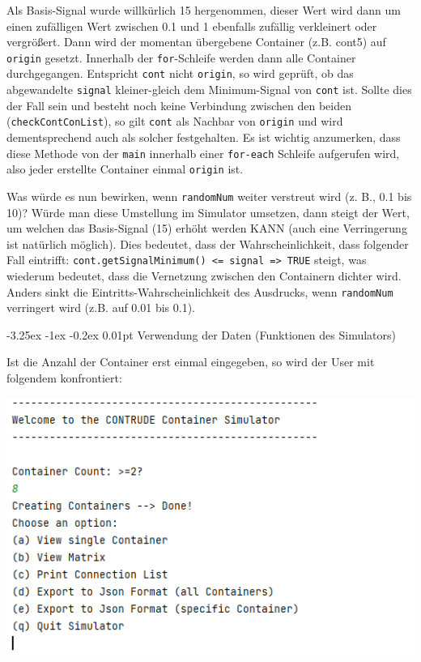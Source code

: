 \documentclass[
    headings=optiontotocandhead,%
    twoside,
    numbers=noenddot,%
    12pt, %
    titlepage, %
    parskip=full, %
    listof=leveldown, 
    numbers=noenddot, %
    a4paper,DIV=14,
    BCOR=15mm,
]{scrbook}
\makeatletter
\newcommand{\passthrough}[1]{#1}
\let\origfigure=\figure
\let\endorigfigure=\endfigure
\renewenvironment{figure}[1][]{%
   \origfigure[H]
}{%
   \endorigfigure
}
\renewcommand\paragraph{\@startsection{paragraph}{4}{\z@}%
    {-3.25ex \@plus -1ex \@minus -0.2ex}%
    {0.01pt}%
    {\raggedsection\normalfont\sectfont\nobreak\size@paragraph}%
  }
\makeatother
\begin{document}
Als Basis-Signal wurde willkürlich 15 hergenommen, dieser Wert wird dann
um einen zufälligen Wert zwischen 0.1 und 1 ebenfalls zufällig
verkleinert oder vergrößert. Dann wird der momentan übergebene Container
(z.B. cont5) auf \passthrough{\lstinline!origin!} gesetzt. Innerhalb der
\passthrough{\lstinline!for!}-Schleife werden dann alle Container
durchgegangen. Entspricht \passthrough{\lstinline!cont!} nicht
\passthrough{\lstinline!origin!}, so wird geprüft, ob das abgewandelte
\passthrough{\lstinline!signal!} kleiner-gleich dem Minimum-Signal von
\passthrough{\lstinline!cont!} ist. Sollte dies der Fall sein und
besteht noch keine Verbindung zwischen den beiden
(\passthrough{\lstinline!checkContConList!}), so gilt
\passthrough{\lstinline!cont!} als Nachbar von
\passthrough{\lstinline!origin!} und wird dementsprechend auch als
solcher festgehalten. Es ist wichtig anzumerken, dass diese Methode von
der \passthrough{\lstinline!main!} innerhalb einer
\passthrough{\lstinline!for-each!} Schleife aufgerufen wird, also jeder
erstellte Container einmal \passthrough{\lstinline!origin!} ist.

Was würde es nun bewirken, wenn \passthrough{\lstinline!randomNum!}
weiter verstreut wird (z. B., 0.1 bis 10)? Würde man diese Umstellung im
Simulator umsetzen, dann steigt der Wert, um welchen das Basis-Signal
(15) erhöht werden KANN (auch eine Verringerung ist natürlich möglich).
Dies bedeutet, dass der Wahrscheinlichkeit, dass folgender Fall
eintrifft:
\passthrough{\lstinline!cont.getSignalMinimum() <= signal => TRUE!}
steigt, was wiederum bedeutet, dass die Vernetzung zwischen den
Containern dichter wird. Anders sinkt die Eintritts-Wahrscheinlichkeit
des Ausdrucks, wenn \passthrough{\lstinline!randomNum!} verringert wird
(z.B. auf 0.01 bis 0.1).

\hypertarget{verwendung-der-daten-funktionen-des-simulators}{%
\paragraph{Verwendung der Daten (Funktionen des
Simulators)}\label{verwendung-der-daten-funktionen-des-simulators}}

Ist die Anzahl der Container erst einmal eingegeben, so wird der User
mit folgendem konfrontiert:

\begin{figure}
\centering
\includegraphics{img/Gekle/SimulatorConsole2.png}
\caption{Funktionen des Simulators}
\end{figure}
\end{document}
